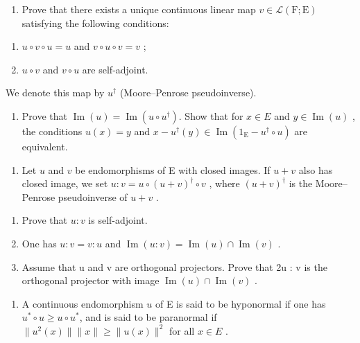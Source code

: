 \begin{enumerate}
\def\labelenumi{\alph{enumi})}
\tightlist
\item
  Prove that there exists a unique continuous linear map \(v \in \mathcal{L}(\mathrm{F};\mathrm{E})\) satisfying the following conditions:
\end{enumerate}

\begin{enumerate}
\def\labelenumi{(\roman{enumi})}
\item
  \(u \circ v \circ u = u\) and \(v \circ u \circ v = v\) ;
\item
  \(u \circ v\) and \(v \circ u\) are self-adjoint.
\end{enumerate}

We denote this map by \(u^{\dagger}\) (Moore--Penrose pseudoinverse).

\begin{enumerate}
\def\labelenumi{\alph{enumi})}
\setcounter{enumi}{1}
\tightlist
\item
  Prove that \(\operatorname{Im}(u) = \operatorname{Im}(u \circ u^{\dagger})\). Show that for \(x \in E\) and \(y \in \operatorname{Im}(u)\) , the conditions \(u(x) = y\) and \(x - u^{\dagger}(y) \in \operatorname{Im}(1_{\operatorname{E}} - u^{\dagger} \circ u)\) are equivalent.
\end{enumerate}

\begin{enumerate}
\def\labelenumi{\arabic{enumi})}
\setcounter{enumi}{8}
\tightlist
\item
  Let \(u\) and \(v\) be endomorphisms of E with closed images. If \(u + v\) also has closed image, we set \(u: v = u \circ (u + v)^{\dagger} \circ v\) , where \((u + v)^{\dagger}\) is the Moore--Penrose pseudoinverse of \(u + v\) .
\end{enumerate}

\begin{enumerate}
\def\labelenumi{\alph{enumi})}
\item
  Prove that \(u:v\) is self-adjoint.
\item
  One has \(u:v=v:u\) and \(\operatorname{Im}(u:v)=\operatorname{Im}(u)\cap\operatorname{Im}(v)\) .
\item
  Assume that u and v are orthogonal projectors. Prove that 2u : v is the orthogonal projector with image \(\operatorname{Im}(u) \cap \operatorname{Im}(v)\) .
\end{enumerate}

\begin{enumerate}
\def\labelenumi{\arabic{enumi})}
\setcounter{enumi}{9}
\tightlist
\item
  A continuous endomorphism \(u\) of E is said to be hyponormal if one has \(u^{*} \circ u \geqslant u \circ u^{*}\), and is said to be paranormal if \(\|u^{2}(x)\|\|x\| \geqslant \|u(x)\|^{2}\) for all \(x \in E\) .
\end{enumerate}

